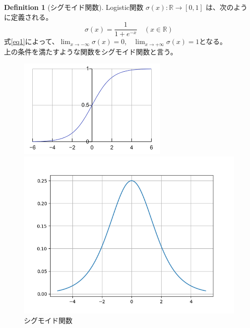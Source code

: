\documentclass[a4paper]{jsarticle}
\theoremstyle{definition}
\newtheorem{dfn}{Definition}
\begin{document}
\begin{dfn}[シグモイド関数]
Logistic関数 $\sigma(x):\mathbb{R}\to [0,1] $ は、次のように定義される。
\begin{equation}
  \sigma(x) = \frac{1}{1 + e^{-x}} \quad (x \in \mathbb{R})\label{eq1}
\end{equation}
式\eqref{eq1}によって、$\displaystyle\lim_{x\to -\infty}\sigma(x)=0$,$\quad\displaystyle\lim_{x\to +\infty}\sigma(x)=1$となる。\\
上の条件を満たすような関数をシグモイド関数と言う。\\
\begin{figure}[h]
  \centering
  \begin{minipage}{0.43\columnwidth}
    \centering
    \includegraphics[width=\columnwidth]{pics/p1.2.png}
    \caption{シグモイド関数}
    \label{fig:p1}
  \end{minipage}
  \hspace{5mm}
  \begin{minipage}{0.43\columnwidth}
    \centering
    \includegraphics[width=\columnwidth]{pics/p1.1.png}

\end{minipage}
\end{figure}
\end{dfn}
\end{document}
